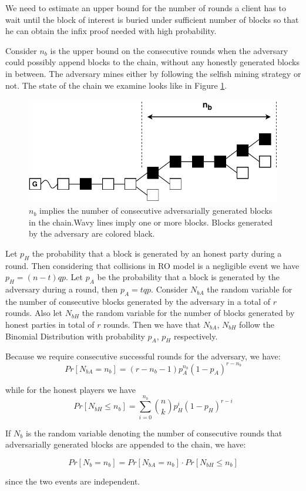 We need to estimate an upper bound for the number of rounds a client has to
wait until the block of interest is buried under sufficient number of blocks
so that he can obtain the infix proof needed with high probability.

Consider $n_b$ is the upper bound on the consecutive rounds when the adversary could
possibly append blocks to the chain, without any honestly generated blocks in
between. The adversary mines either by following the selfish mining strategy or
not. The state of the chain we examine looks like in Figure \ref{fig:infix_delay}.

\begin{figure}[h!]
	\begin{center}
		\includegraphics[width=0.8\columnwidth]{figures/infix_delay.pdf}
	\end{center}
	\caption{ \textbf{$n_b$} implies the number of consecutive
	 adversarially generated blocks in the chain.Wavy lines imply one or more blocks. Blocks generated by the
	 adversary are colored black.}
	\label{fig:infix_delay}
\end{figure}

Let $p_H$ the probability that a block is generated by an honest party during a round.
Then considering that collisions in RO model is a negligible event we have
$p_H = (n-t)qp$. Let $p_A$ be the probability that a block is generated by the
adversary during a round, then $p_A = tqp$. Consider $N_{bA}$ the random variable
for the number of consecutive blocks generated by the adversary in a total of $r$
rounds. Also let $N_{bH}$ the random variable for the number of blocks generated by
honest parties in total of $r$ rounds. 
Then we have that $N_{bA}$, $N_{bH}$ follow the Binomial Distribution with
probability $p_A$, $p_H$ respectively.

Because we require consecutive successful rounds for the adversary, we have:
\begin{equation}
	Pr[N_{bA} = n_b] = (r-n_b - 1) p_A^{n_b}(1-p_A)^{r-n_b}
\end{equation}

while for the honest players we have 
\begin{equation}
	Pr[N_{bH} \leq n_b] = \sum_{i=0}^{n_b} \binom nk p_H^{i}(1-p_H)^{r-i}
\end{equation}

If $N_b$ is the random variable denoting the number of consecutive rounds that
adversarially generated blocks are appended to the chain, we have:

\begin{equation}
	Pr[N_b = n_b] = Pr[N_{bA} = n_b] \cdot Pr[N_{bH} \leq n_b]
\end{equation}

since the two events are independent.
